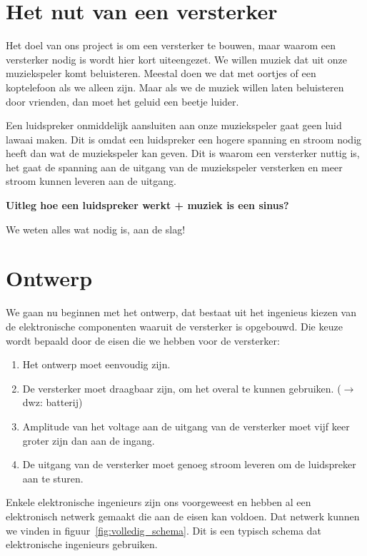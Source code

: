 \documentclass{article}
\begin{document}
\section{Het nut van een versterker}

Het doel van ons project is om een versterker te bouwen, maar waarom een versterker nodig is wordt hier kort uiteengezet. We willen muziek dat uit onze muziekspeler komt beluisteren. Meestal doen we dat met oortjes of een koptelefoon als we alleen zijn. Maar als we de muziek willen laten beluisteren door vrienden, dan moet het geluid een beetje luider.

Een luidspreker onmiddelijk aansluiten aan onze muziekspeler gaat geen luid lawaai maken. Dit is omdat een luidspreker een hogere spanning en stroom nodig heeft dan wat de muziekspeler kan geven. Dit is waarom een versterker nuttig is, het gaat de spanning aan de uitgang van de muziekspeler versterken en meer stroom kunnen leveren aan de uitgang.

\textbf{Uitleg hoe een luidspreker werkt + muziek is een sinus?}

We weten alles wat nodig is, aan de slag!

\section{Ontwerp}

We gaan nu beginnen met het ontwerp, dat bestaat uit het ingenieus kiezen van de elektronische componenten waaruit de versterker is opgebouwd. Die keuze wordt bepaald door de eisen die we hebben voor de versterker:

\begin{enumerate}
	\item Het ontwerp moet eenvoudig zijn.
	\item De versterker moet draagbaar zijn, om het overal te kunnen gebruiken. ($\rightarrow$ dwz: batterij)
	\item Amplitude van het voltage aan de uitgang van de versterker moet vijf keer groter zijn dan aan de ingang.
	\item De uitgang van de versterker moet genoeg stroom leveren om de luidspreker aan te sturen.
\end{enumerate}

Enkele elektronische ingenieurs zijn ons voorgeweest en hebben al een elektronisch netwerk gemaakt die aan de eisen kan voldoen. Dat netwerk kunnen we vinden in figuur~\ref{fig:volledig_schema}. Dit is een typisch schema dat elektronische ingenieurs gebruiken. 
\end{document}
